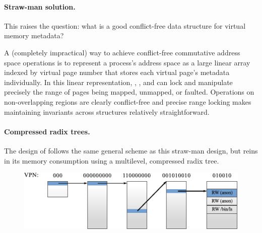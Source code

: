 \begin{figure}
  \centering
  
  \label{fig:skiplist}
\end{figure}

\paragraph{Straw-man solution.}
This raises the question: what is a good conflict-free data structure
for virtual memory metadata?

A (completely impractical) way to achieve conflict-free commutative
address space
operations is to represent a process's address space as a large linear
array indexed by virtual page number that stores each virtual page's
metadata individually.
%
In this linear representation, , ,
and  can lock and manipulate precisely the range of
pages being mapped, unmapped, or faulted.
%
Operations on non-overlapping regions are clearly conflict-free and
precise range locking makes maintaining invariants across structures
relatively straightforward.

\paragraph{Compressed radix trees.}
The design of \vm follows the same general
scheme as this straw-man design, but reins in its memory consumption
using a multilevel, compressed radix tree.

\begin{figure}
  \centering
  \includegraphics{figures/radix.pdf}
  \label{fig:radix}
\end{figure}

